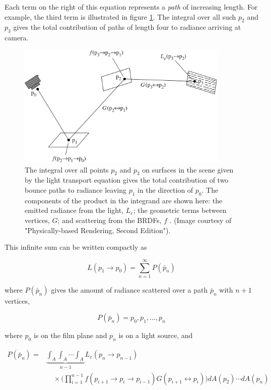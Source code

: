Each term on the right of this equation represents a \textit{path} of increasing length. For example, the third term is illustrated in figure \ref{f:three-point-form-1}. The integral over all such $p_2$ and $p_3$ gives the total contribution of paths of length four to radiance arriving at camera.

\begin{figure}\label{f:three-point-form-1}
	\includegraphics[width=0.9\textwidth]{graphics/gi/path-5}
	\caption{The integral over all points $p_2$ and $p_3$ on surfaces in the scene given by the light transport equation gives the total contribution of two bounce paths to radiance leaving $p_1$ in the direction of $p_0$. The components of the product in the integrand are shown here: the emitted radiance from the light, $L_e$; the geometric terms between vertices, $G$; and scattering from the BRDFs, $f$ . (Image courtesy of "Physically-based Rendering, Second Edition").}
\end{figure}

This infinite sum can be written compactly as 

\begin{equation}\label{e:path-form}
	L(p_1\to p_0)=\sum_{n=1}^{\infty}P(\bar{p}_n)
\end{equation}

where $P(\bar{p}_n)$ gives the amount of radiance scattered over a path $\bar{p}_n$ with $n+1$ vertices,

\begin{equation*}
	P(\bar{p}_n)=p_0,p_1,...,p_n
\end{equation*}

where $p_0$ is on the film plane and $p_n$ is on a light source, and 

\begin{equation*}
	\begin{aligned}
		P(\bar{p}_n)=&\underbrace{\int_A\int_A \cdots\int_A}_{n-1}L_e(p_n\to p_{n-1})\\
		&\quad\times\Bigg(\prod_{i=1}^{n-1}f(p_{i+1}\to p_i\to p_{i-1})G(p_{i+1}\leftrightarrow p_i)\Bigg) dA(p_2)\cdots dA(p_n)
	\end{aligned}
\end{equation*}

